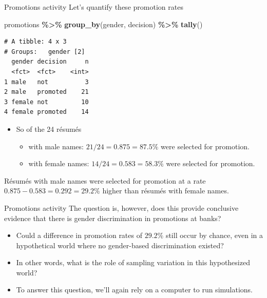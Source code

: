 \documentclass[
  ignorenonframetext,
]{beamer}
\newenvironment{Shaded}{\begin{snugshade}}{\end{snugshade}}
\newcommand{\FunctionTok}[1]{\textcolor[rgb]{0.13,0.29,0.53}{\textbf{#1}}}
\newcommand{\NormalTok}[1]{#1}
\newcommand{\SpecialCharTok}[1]{\textcolor[rgb]{0.81,0.36,0.00}{\textbf{#1}}}
\providecommand{\tightlist}{%
  \setlength{\itemsep}{0pt}\setlength{\parskip}{0pt}}
\begin{document}
\begin{frame}[fragile]{Promotions activity}
\protect\hypertarget{promotions-activity-4}{}
Let's quantify these promotion rates

\tiny

\begin{Shaded}
\begin{Highlighting}[]
\NormalTok{promotions }\SpecialCharTok{\%\textgreater{}\%} 
  \FunctionTok{group\_by}\NormalTok{(gender, decision) }\SpecialCharTok{\%\textgreater{}\%} 
  \FunctionTok{tally}\NormalTok{()}
\end{Highlighting}
\end{Shaded}

\begin{verbatim}
# A tibble: 4 x 3
# Groups:   gender [2]
  gender decision     n
  <fct>  <fct>    <int>
1 male   not          3
2 male   promoted    21
3 female not         10
4 female promoted    14
\end{verbatim}

\normalsize

\begin{itemize}
\item
  So of the 24 résumés

  \begin{itemize}
  \tightlist
  \item
    with male names: \(21/24=0.875=87.5\%\) were selected for promotion.
  \item
    with female names: \(14/24=0.583=58.3\%\) were selected for
    promotion.
  \end{itemize}
\end{itemize}

Résumés with male names were selected for promotion at a rate
\(0.875 -0.583 = 0.292 = 29.2\%\) higher than résumés with female names.
\end{frame}

\begin{frame}{Promotions activity}
\protect\hypertarget{promotions-activity-5}{}
The question is, however, does this provide conclusive evidence that
there is gender discrimination in promotions at banks?

\begin{itemize}
\item
  Could a difference in promotion rates of \(29.2\%\) still occur by
  chance, even in a hypothetical world where no gender-based
  discrimination existed?
\item
  In other words, what is the role of sampling variation in this
  hypothesized world?
\item
  To answer this question, we'll again rely on a computer to run
  simulations.
\end{itemize}
\end{frame}
\end{document}
